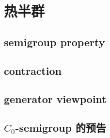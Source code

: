 \section{热半群}
\label{b2:sec:1204}


\subsection{semigroup property}
\label{b2:subsec:120401}

\subsection{contraction}
\label{b2:subsec:120402}

\subsection{generator viewpoint}
\label{b2:subsec:120403}

\subsection{\texorpdfstring{\(C_0\)}{C0}-semigroup 的预告}
\label{b2:subsec:120404}


